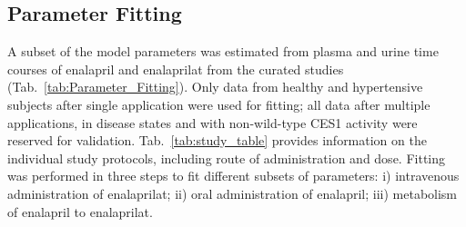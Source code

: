 \documentclass[pharmaceutics,article,submit,pdftex,moreauthors]{Definitions/mdpi}
\begin{document}
\subsection{Parameter Fitting}
\label{sec:results_parameter_fitting}
{\color{red}A subset of the model parameters was estimated from plasma and urine time courses of enalapril and enalaprilat from the curated studies~\cite{Arafat2005, Ghosh2012, Ishizaki1988} (Tab.~\ref{tab:Parameter_Fitting}). Only data from healthy and hypertensive subjects after single application were used for fitting; all data after multiple applications, in disease states and with non-wild-type CES1 activity were reserved for validation. Tab.~\ref{tab:study_table} provides information on the individual study protocols, including route of administration and dose.} 
Fitting was performed in three steps to fit different subsets of parameters: i) intravenous administration of enalaprilat; ii) oral administration of enalapril; iii) metabolism of enalapril to enalaprilat.
\end{document}
